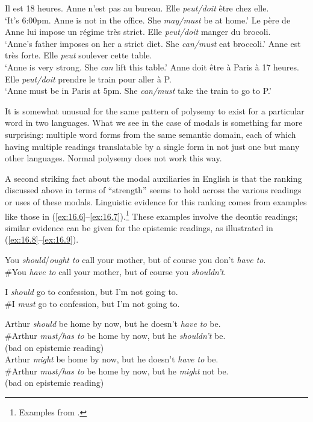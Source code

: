 \ea \label{ex:16.5}
\ea   Il est 18 heures. Anne n’est pas au bureau. Elle \textit{peut/doit} être chez elle.\\
\glt ‘It’s 6:00pm. Anne is not in the office. She \textit{may/must} be at home.’
\ex   Le père de Anne lui impose un régime très strict. Elle \textit{peut/doit} manger du brocoli.\\
\glt ‘Anne’s father imposes on her a strict diet. She \textit{can/must} eat broccoli.’
\ex Anne est très forte. Elle \textit{peut} soulever cette table.\\
\glt ‘Anne is very strong. She \textit{can} lift this table.’
\ex  Anne doit être à Paris à 17 heures. Elle \textit{peut/doit} prendre le train pour aller à P.\\
\glt ‘Anne must be in Paris at 5pm. She \textit{can/must} take the train to go to P.’
\z \z


It is somewhat unusual for the same pattern of polysemy to exist for a particular word in two languages. What we see in the case of modals is something far more surprising: multiple word forms from the same semantic domain, each of which having multiple readings translatable by a single form in not just one but many other languages. Normal polysemy does not work this way.



A second striking fact about the modal auxiliaries in English is that the ranking discussed above in terms of “strength” seems to hold across the various readings or uses of these modals. Linguistic evidence for this ranking comes from examples like those in (\ref{ex:16.6}--\ref{ex:16.7}).\footnote{Examples from \citet{vonFintel2006}.} These examples involve the deontic readings; similar evidence can be given for the epistemic readings, as illustrated in (\ref{ex:16.8}--\ref{ex:16.9}).


\ea \label{ex:16.6}
\ea  You \textit{should}/\textit{ought} \textit{to} call your mother, but of course you don’t \textit{have to}.\\
\ex \#You \textit{have to} call your mother, but of course you \textit{shouldn’t}.
\z \z

\ea \label{ex:16.7}
\ea  I \textit{should} go to confession, but I’m not going to.\\
\ex \#I \textit{must} go to confession, but I’m not going to.
                       \z
\z

\ea \label{ex:16.8}
\ea  Arthur \textit{should} be home by now, but he doesn’t \textit{have to} be.\\
\ex \#Arthur \textit{must/has to} be home by now, but he \textit{shouldn’t} be.\\
  (bad on epistemic reading)\\
\ex Arthur \textit{might} be home by now, but he doesn’t \textit{have to} be.\\
\ex \#Arthur \textit{must/has to} be home by now, but he \textit{might} not be.\\
  (bad on epistemic reading)
                       \z
\z

